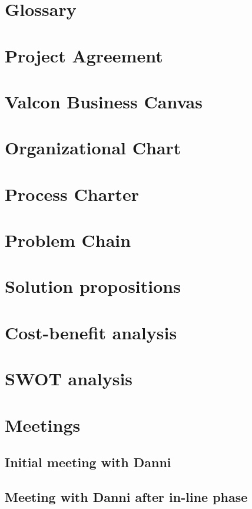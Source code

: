 \chapter{Glossary}

\chapter{Project Agreement}

\chapter{Valcon Business Canvas}

\chapter{Organizational Chart}

\chapter{Process Charter}

\chapter{Problem Chain}

\chapter{Solution propositions}

\chapter{Cost-benefit analysis}

\chapter{SWOT analysis}

\chapter{Meetings}
\section{Initial meeting with Danni}

\section{Meeting with Danni after in-line phase}

